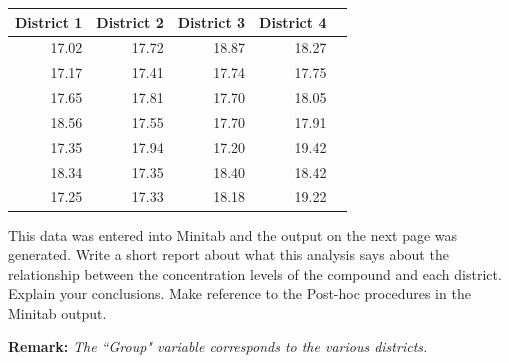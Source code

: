 \documentclass[a4paper,12pt]{article}
\begin{document}
\begin{table}[ht]
	\centering
	\begin{tabular}{|r|r|r|r|r|}
		\hline
		 
		District 1 & District 2 & District 3 & District 4    \\ \hline
		\hline
		 17.02 & 17.72 & 18.87 & 18.27 \\ 
		 17.17 & 17.41 & 17.74 & 17.75  \\ 
		 17.65 & 17.81 & 17.70 & 18.05  \\ 
		 18.56 & 17.55 & 17.70 & 17.91  \\ 
		 17.35 & 17.94 & 17.20 & 19.42  \\ 
		 18.34 & 17.35 & 18.40 & 18.42  \\ 
		 17.25 & 17.33 & 18.18 & 19.22  \\ 
		\hline
	\end{tabular}
\end{table}

\noindent This data was entered into Minitab and the output on the next page was generated. Write a
short report about what this analysis says about the relationship between the concentration levels of the compound and each district. Explain your conclusions. Make reference to the Post-hoc procedures in the Minitab output.

\bigskip


\noindent \textbf{Remark:} \textit{The ``Group" variable corresponds to the various districts.}
%
%
%
%
%
%
\newpage
\end{document}
